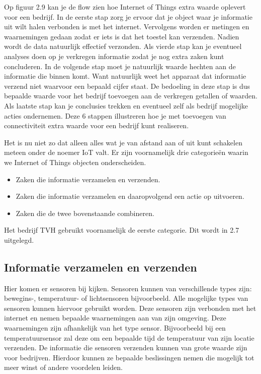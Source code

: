 Op figuur 2.9 kan je de flow zien hoe Internet of Things extra waarde oplevert voor een bedrijf. In de eerste stap zorg je ervoor dat je object waar je informatie uit wilt halen verbonden is met het internet. Vervolgens worden er metingen en waarnemingen gedaan zodat er iets is dat het toestel kan verzenden. Nadien wordt de data natuurlijk effectief verzonden. Als vierde stap kan je eventueel analyses doen op je verkregen informatie zodat je nog extra zaken kunt concluderen. In de volgende stap moet je natuurlijk waarde hechten aan de informatie die binnen komt. Want natuurlijk weet het apparaat dat informatie verzend niet waarvoor een bepaald cijfer staat. De bedoeling in deze stap is dus bepaalde waarde voor het bedrijf toevoegen aan de verkregen getallen of waarden. Als laatste stap kan je conclusies trekken en eventueel zelf als bedrijf mogelijke acties ondernemen. Deze 6 stappen illustreren hoe je met toevoegen van connectiviteit extra waarde voor een bedrijf kunt realiseren.

Het is nu niet zo dat alleen alles wat je van afstand aan of uit kunt schakelen meteen onder de noemer IoT valt. Er zijn voornamelijk drie categorieën waarin we Internet of Things objecten onderscheiden.

\begin{itemize}
    \item Zaken die informatie verzamelen en verzenden.
    \item Zaken die informatie verzamelen en daaropvolgend een actie op uitvoeren.
    \item Zaken die de twee bovenstaande combineren.
\end{itemize}

Het bedrijf TVH gebruikt voornamelijk de eerste categorie. Dit wordt in 2.7 uitgelegd.

\subsection{Informatie verzamelen en verzenden}
Hier komen er sensoren bij kijken. Sensoren kunnen van verschillende types zijn: bewegins-, temperatuur- of lichtsensoren bijvoorbeeld. Alle mogelijke types van sensoren kunnen hiervoor gebruikt worden. Deze sensoren zijn verbonden met het internet en nemen bepaalde waarnemingen aan van zijn omgeving. Deze waarnemingen zijn afhankelijk van het type sensor. Bijvoorbeeld bij een temperatuursensor zal deze om een bepaalde tijd de temperatuur van zijn locatie verzenden. De informatie die sensoren verzenden kunnen van grote waarde zijn voor bedrijven. Hierdoor kunnen ze bepaalde beslissingen nemen die mogelijk tot meer winst of andere voordelen leiden. 

